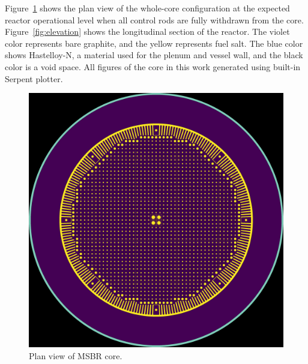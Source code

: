 \documentclass{anstrans}
\begin{document}
Figure~\ref{fig:plan} shows the plan view of the whole-core configuration at the expected reactor operational level when all control rods are fully withdrawn from the core.  Figure~\ref{fig:elevation} shows the longitudinal section of the reactor. The violet color represents bare graphite, and the yellow represents fuel salt. The blue color shows Hastelloy-N, a material used for the plenum and vessel wall, and the black color is a void space. All figures of the core in this work generated using built-in Serpent plotter.
\begin{figure}[!htb] %
  \centering
  \vspace{-0.6em}
  \includegraphics[width=0.93\linewidth]{figure_2_1.png}
  \caption{Plan view of MSBR core.}
  \label{fig:plan}
\end{figure}
\end{document}
